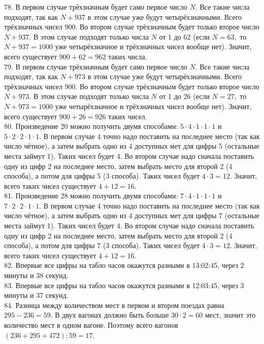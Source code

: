 \documentclass[12pt]{article}
\begin{document}
78. В первом случае трёхзначным будет само первое число $N.$ Все такие числа подходят, так как $N+937$ в этом случае уже будут четырёхзначными. Всего трёхзначных чисел 900. Во втором случае трёхзначным будет только второе число $N+937.$ В этом случае подходят только числа $N$ от 1 до 62 (если $N=63,$ то $N+937=1000$ уже четырёхзначное и трёхзначных чисел вообще нет). Значит, всего существует $900+62=962$ таких числа.\\
79. В первом случае трёхзначным будет само первое число $N.$ Все такие числа подходят, так как $N+973$ в этом случае уже будут четырёхзначными. Всего трёхзначных чисел 900. Во втором случае трёхзначным будет только второе число $N+973.$ В этом случае подходят только числа $N$ от 1 до 26 (если $N=27,$ то $N+973=1000$ уже четырёхзначное и трёхзначных чисел вообще нет). Значит, всего существует $900+26=926$ таких чисел.\\
80. Произведение 20 можно получить двумя способами: $5\cdot4\cdot1\cdot1\cdot1$ и $5\cdot2\cdot2\cdot1\cdot1.$ В первом случае 4 точно надо поставить на последнее место (так как число чётное), а затем выбрать одно из 4 доступных мет для цифры 5 (остальные места займут 1). Таких чисел будет 4. Во втором случае надо сначала поставить одну из цифр 2 на последнее место, затем выбрать место для второй 2 (4 способа), а потом для цифры 5 (3 способа). Таких чисел будет $4\cdot3=12.$ Значит, всего таких чисел существует $4+12=16.$\\
81. Произведение 28 можно получить двумя способами: $7\cdot4\cdot1\cdot1\cdot1$ и $7\cdot2\cdot2\cdot1\cdot1.$ В первом случае 4 точно надо поставить на последнее место (так как число чётное), а затем выбрать одно из 4 доступных мет для цифры 7 (остальные места займут 1). Таких чисел будет 4. Во втором случае надо сначала поставить одну из цифр 2 на последнее место, затем выбрать место для второй 2 (4 способа), а потом для цифры 7 (3 способа). Таких чисел будет $4\cdot3=12.$ Значит, всего таких чисел существует $4+12=16.$\\
82. Впервые все цифры на табло часов окажутся разными в 13:02:45, через 2 минуты и 38 секунд.\\
83. Впервые все цифры на табло часов окажутся разными в 12:03:45, через 3 минуты и 37 секунд.\\
84. Разница между количеством мест в первом и втором поездах равна $295-236=59.$ В двух вагонах должно быть больше $30\cdot2=60$ мест, значит это количество мест в одном вагоне. Поэтому всего вагонов $(236+295+472):59=17.$\\
\end{document}
